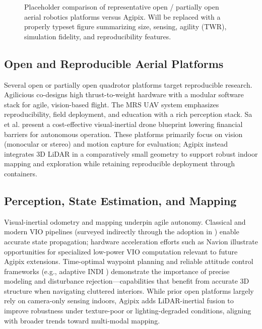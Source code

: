 \documentclass[letterpaper, 10 pt, conference]{ieeeconf}  %
\begin{document}
\begin{figure*}[t]
        \centering
        \caption{Placeholder comparison of representative open / partially open aerial robotics platforms versus Agipix. Will be replaced with a properly typeset figure summarizing size, sensing, agility (TWR), simulation fidelity, and reproducibility features.}
        \label{fig:platform_comparison}
\end{figure*}

\subsection{Open and Reproducible Aerial Platforms}
Several open or partially open quadrotor platforms target reproducible research. Agilicious \cite{Foehn2022Agilicious} co-designs high thrust-to-weight hardware with a modular software stack for agile, vision-based flight. The MRS UAV system \cite{Baca2021jirs} emphasizes reproducibility, field deployment, and education with a rich perception stack. Sa et al. \cite{Sa2018ram} present a cost-effective visual-inertial drone blueprint lowering financial barriers for autonomous operation. These platforms primarily focus on vision (monocular or stereo) and motion capture for evaluation; Agipix instead integrates 3D LiDAR in a comparatively small geometry to support robust indoor mapping and exploration while retaining reproducible deployment through containers.

\subsection{Perception, State Estimation, and Mapping}
Visual-inertial odometry and mapping underpin agile autonomy. Classical and modern VIO pipelines (surveyed indirectly through the adoption in \cite{Sa2018ram,Foehn2022Agilicious}) enable accurate state propagation; hardware acceleration efforts such as Navion \cite{Suleiman2019jssc} illustrate opportunities for specialized low-power VIO computation relevant to future Agipix extensions. Time-optimal waypoint planning \cite{Foehn2021science} and reliable attitude control frameworks (e.g., adaptive INDI \cite{smeur2016jgcd}) demonstrate the importance of precise modeling and disturbance rejection—capabilities that benefit from accurate 3D structure when navigating cluttered interiors. While prior open platforms largely rely on camera-only sensing indoors, Agipix adds LiDAR-inertial fusion to improve robustness under texture-poor or lighting-degraded conditions, aligning with broader trends toward multi-modal mapping.
\end{document}
